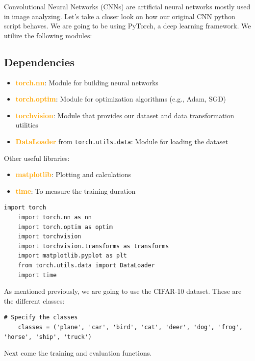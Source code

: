 Convolutional Neural Networks (CNNs) are artificial neural networks mostly used in image analyzing.
Let's take a closer look on how our original CNN python script behaves. We are going to be using 
PyTorch, a deep learning framework. We utilize the following modules:
\subsection{Dependencies}
\begin{itemize}
    \item \textcolor{orange}{\textbf{torch.nn}}: Module for building neural networks
    \item \textcolor{orange}{\textbf{torch.optim}}: Module for optimization algorithms (e.g., Adam, SGD)
    \item \textcolor{orange}{\textbf{torchvision}}: Module that provides our dataset and data transformation utilities
    \item \textcolor{orange}{\textbf{DataLoader}} from \texttt{torch.utils.data}: Module for loading the dataset
\end{itemize}

Other useful libraries:
\begin{itemize}
    \item \textcolor{orange}{\textbf{matplotlib}}: Plotting and calculations
    \item \textcolor{orange}{\textbf{time}}: To measure the training duration
\end{itemize}

\begin{lstlisting}[caption={Dependencies Code}, label={lst:dependencies}]
    import torch
    import torch.nn as nn
    import torch.optim as optim
    import torchvision
    import torchvision.transforms as transforms
    import matplotlib.pyplot as plt
    from torch.utils.data import DataLoader
    import time
\end{lstlisting}

As mentioned previously, we are going to use the CIFAR-10 dataset. These are the different classes:
\begin{lstlisting}[caption={CIFAR-10 Classes}, label={lst:cifar_classes}]
    # Specify the classes
    classes = ('plane', 'car', 'bird', 'cat', 'deer', 'dog', 'frog', 'horse', 'ship', 'truck')
\end{lstlisting}

Next come the training and evaluation functions.

